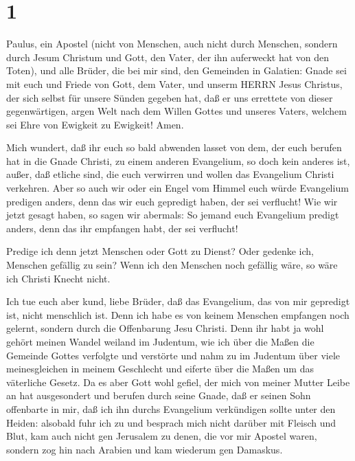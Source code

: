 \hypertarget{section}{%
\section{1}\label{section}}

 Paulus, ein Apostel (nicht von Menschen, auch nicht durch
Menschen, sondern durch Jesum Christum und Gott, den Vater, der ihn
auferweckt hat von den Toten),  und alle Brüder, die bei mir
sind, den Gemeinden in Galatien:  Gnade sei mit euch und
Friede von Gott, dem Vater, und unserm HERRN Jesus Christus,
 der sich selbst für unsere Sünden gegeben hat, daß er uns
errettete von dieser gegenwärtigen, argen Welt nach dem Willen Gottes
und unseres Vaters,  welchem sei Ehre von Ewigkeit zu
Ewigkeit! Amen.

 Mich wundert, daß ihr euch so bald abwenden lasset von dem,
der euch berufen hat in die Gnade Christi, zu einem anderen Evangelium,
 so doch kein anderes ist, außer, daß etliche sind, die euch
verwirren und wollen das Evangelium Christi verkehren.  Aber
so auch wir oder ein Engel vom Himmel euch würde Evangelium predigen
anders, denn das wir euch gepredigt haben, der sei verflucht!
 Wie wir jetzt gesagt haben, so sagen wir abermals: So
jemand euch Evangelium predigt anders, denn das ihr empfangen habt, der
sei verflucht!

 Predige ich denn jetzt Menschen oder Gott zu Dienst? Oder
gedenke ich, Menschen gefällig zu sein? Wenn ich den Menschen noch
gefällig wäre, so wäre ich Christi Knecht nicht.

 Ich tue euch aber kund, liebe Brüder, daß das Evangelium,
das von mir gepredigt ist, nicht menschlich ist.  Denn ich
habe es von keinem Menschen empfangen noch gelernt, sondern durch die
Offenbarung Jesu Christi.  Denn ihr habt ja wohl gehört
meinen Wandel weiland im Judentum, wie ich über die Maßen die Gemeinde
Gottes verfolgte und verstörte  und nahm zu im Judentum
über viele meinesgleichen in meinem Geschlecht und eiferte über die
Maßen um das väterliche Gesetz.  Da es aber Gott wohl
gefiel, der mich von meiner Mutter Leibe an hat ausgesondert und berufen
durch seine Gnade,  daß er seinen Sohn offenbarte in mir,
daß ich ihn durchs Evangelium verkündigen sollte unter den Heiden:
alsobald fuhr ich zu und besprach mich nicht darüber mit Fleisch und
Blut,  kam auch nicht gen Jerusalem zu denen, die vor mir
Apostel waren, sondern zog hin nach Arabien und kam wiederum gen
Damaskus.

